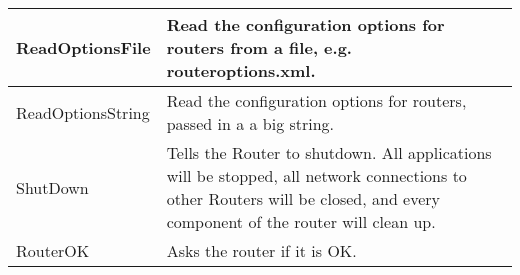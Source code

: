 {\begin{longtable}[l]{ | l | p{10cm} | }
ReadOptionsFile & Read the configuration options for routers from a
file, e.g. routeroptions.xml. \\
\hline

ReadOptionsString & Read the configuration options for routers, passed
in a a big string. \\
\hline

ShutDown & Tells the Router to shutdown.  All applications will be
stopped, all network connections to other Routers will be closed, and
every component of the router will clean up. \\
\hline

RouterOK & Asks the router if it is OK.\\
\hline





\end{longtable}  

}












